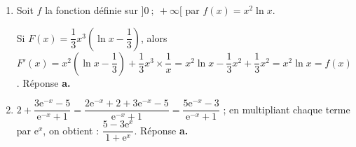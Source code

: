 \documentclass[10pt]{article}
\begin{document}
\begin{enumerate}
$\bullet~~$On a $\dfrac{n}{n + 1} = \dfrac{1}{1 + \frac1 n}$.
Or $\displaystyle\lim_{n \to + \infty} \frac1 n = 0 \Rightarrow \displaystyle\lim_{n \to + \infty} \dfrac{n}{n + 1} = 1$ et $\displaystyle\lim_{n \to + \infty}2 - \dfrac{n}{n + 1} = 1$.



On a donc  $1  + \left(\dfrac14\right)^n \leqslant u_n \leqslant 2 - \dfrac{n}{n+1}$ avec  $\displaystyle\lim_{n \to + \infty}1 + \left(\dfrac14\right)^n = \displaystyle\lim_{n \to + \infty}2 - \dfrac{n}{n + 1} = 1$. 

D'après le théorème des gendarmes, on peut dire que la suite $(u_n)$ est convergente et que $\displaystyle\lim_{n \to + \infty} u_n=1$.\hfill
Réponse \textbf{b.}

\item Soit $f$ la fonction définie sur $]0~;~+\infty[$ par $f(x) = x^2 \ln x$.










Si $F(x) = \dfrac13 x^3 \left(\ln x - \dfrac13 \right)$, alors 
$F'(x) = x^2\left(\ln x - \dfrac13 \right) + \dfrac13 x^3 \times \dfrac{1}{x} = x^2 \ln x - \dfrac13 x^2  + \dfrac13 x^2 = x^2 \ln x = f(x)$. \hfill Réponse \textbf{a.}

\item 








$2 + \dfrac{3\text{e}^{-x} - 5}{\text{e}^{-x} + 1} = \dfrac{2\text{e}^{-x} + 2  + 3\text{e}^{-x} - 5}{\text{e}^{-x} + 1} = \dfrac{5\text{e}^{-x} - 3}{\text{e}^{-x} + 1}$ ; en multipliant chaque terme par $\text{e}^x$, on obtient : $\dfrac{5 - 3\text{e}^x}{1 + \text{e}^x}$. \hfill Réponse \textbf{a.}
\end{enumerate}

\bigskip
\end{document}
